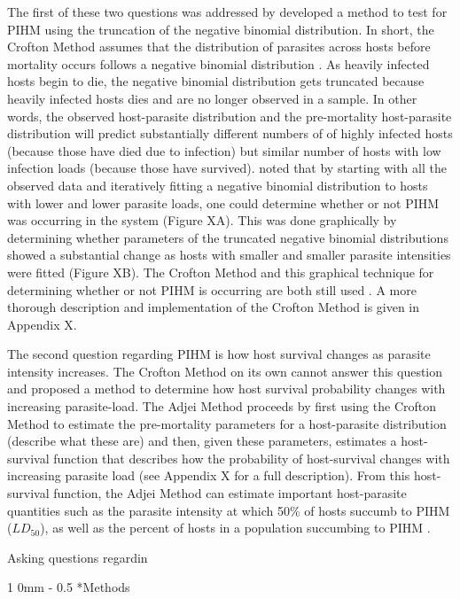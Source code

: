 \documentclass[12pt, a4paper]{article}
\makeatletter
\renewcommand{\section}{\@startsection
{section}%
{1}%
{0mm}%
{-\baselineskip}%
{0.5\baselineskip}%
{\normalfont\bf\large}} %
\makeatother
\begin{document}
The first of these two questions was addressed by \cite{Crofton1971a} developed
a method to test for PIHM using the truncation of the negative binomial
distribution.  In short, the Crofton Method assumes that the distribution of
parasites across hosts before mortality occurs follows a negative binomial
distribution \citep{AndersonandMay1978,Shaw1998}.  As heavily infected hosts
begin to die, the negative binomial distribution gets truncated because heavily
infected hosts dies and are no longer observed in a sample. In other words, the
observed host-parasite distribution and the pre-mortality host-parasite
distribution will predict substantially different numbers of of highly infected
hosts (because those have died due to infection) but similar number of hosts with low infection
loads (because those have survived).  \citep{Crofton1971a} noted that by
starting with all the observed data and iteratively fitting a negative binomial
distribution to hosts with lower and lower parasite loads, one could determine
whether or not PIHM was occurring in the system (Figure XA).  This was done
graphically by determining whether parameters of the truncated negative binomial distributions showed a substantial change as hosts with smaller and smaller parasite intensities were fitted (Figure XB).  The Crofton Method and this graphical technique for determining whether or not PIHM is occurring are both still used \citep{Ferguson2011}. A more thorough description and implementation of the Crofton Method is given in Appendix X.

The second question regarding PIHM is how host survival changes as parasite
intensity increases. The Crofton Method on its own cannot answer this question
and \cite{Adjei1986} proposed a method to determine how host survival
probability changes with increasing parasite-load.  The Adjei Method proceeds
by first using the Crofton Method to estimate the pre-mortality parameters for
a host-parasite distribution (describe what these are) and then, given these parameters, estimates a host-survival function that describes how the probability of host-survival changes with increasing parasite load (see Appendix X for a full description).  From this host-survival function, the Adjei Method can estimate important host-parasite quantities such as the parasite intensity at which 50\% of hosts succumb to PIHM ($LD_{50}$), as well as the percent of hosts in a population succumbing to PIHM \citep{Adjei1986}.

Asking questions regardin


\section*{Methods}
\end{document}
